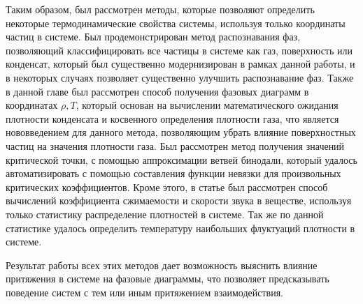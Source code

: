 Таким образом, был рассмотрен методы, которые позволяют определить некоторые термодинамические свойства системы, используя только координаты частиц в системе. Был продемонстрирован метод распознавания фаз, позволяющий классифицировать все частицы в системе как газ, поверхность или конденсат, который был существенно модернизирован в рамках данной работы, и в некоторых случаях позволяет существенно улучшить распознавание фаз.
Также в данной главе был рассмотрен способ получения фазовых диаграмм в координатах $\rho, T$, который основан на вычислении математического ожидания плотности конденсата и косвенного определения плотности газа, что является нововведением для данного метода, позволяющим убрать влияние поверхностных частиц на значения плотности газа. 
Был рассмотрен метод получения значений критической точки, с помощью аппроксимации ветвей бинодали, который удалось автоматизировать с помощью составления функции невязки для произвольных критических коэффициентов.
Кроме этого, в статье был рассмотрен способ вычислений коэффициента сжимаемости и скорости звука в веществе, используя только статистику распределение плотностей в системе. Так же по данной статистике удалось определить температуру наибольших флуктуаций плотности в системе.

Результат работы всех этих методов дает возможность выяснить влияние притяжения в системе на фазовые диаграммы, что позволяет предсказывать поведение систем с тем или иным притяжением взаимодействия.

